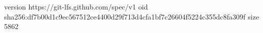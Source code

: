 version https://git-lfs.github.com/spec/v1
oid sha256:df7b00d1c9ec567512ce4400d29f713d4cfa1bf7c26604f5224c355dc8fa309f
size 5862

